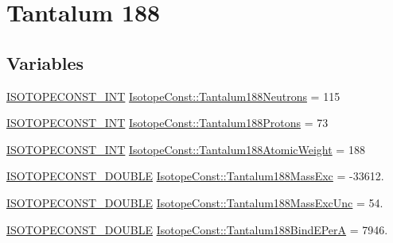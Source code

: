 \hypertarget{group___isotope_const-_tantalum-_ta188}{}\section{Tantalum 188}
\label{group___isotope_const-_tantalum-_ta188}
\subsection*{Variables}
\begin{DoxyCompactItemize}
\item 
\mbox{\hyperlink{group___isotope_const-_macros_ga5f18360b3e99483a35c32d789e62621c}{I\+S\+O\+T\+O\+P\+E\+C\+O\+N\+S\+T\+\_\+\+I\+NT}} \mbox{\hyperlink{group___isotope_const-_tantalum-_ta188_ga2b395f6f2262f135de4d45d89b075531}{Isotope\+Const\+::\+Tantalum188\+Neutrons}} = 115
\item 
\mbox{\hyperlink{group___isotope_const-_macros_ga5f18360b3e99483a35c32d789e62621c}{I\+S\+O\+T\+O\+P\+E\+C\+O\+N\+S\+T\+\_\+\+I\+NT}} \mbox{\hyperlink{group___isotope_const-_tantalum-_ta188_gab4442b2ecd0aeb4df27671aa385fe9a0}{Isotope\+Const\+::\+Tantalum188\+Protons}} = 73
\item 
\mbox{\hyperlink{group___isotope_const-_macros_ga5f18360b3e99483a35c32d789e62621c}{I\+S\+O\+T\+O\+P\+E\+C\+O\+N\+S\+T\+\_\+\+I\+NT}} \mbox{\hyperlink{group___isotope_const-_tantalum-_ta188_ga32574c9578e79318248dab5877d17a56}{Isotope\+Const\+::\+Tantalum188\+Atomic\+Weight}} = 188
\item 
\mbox{\hyperlink{group___isotope_const-_macros_ga8f45a7272ce02c0b4c65c44636ed719a}{I\+S\+O\+T\+O\+P\+E\+C\+O\+N\+S\+T\+\_\+\+D\+O\+U\+B\+LE}} \mbox{\hyperlink{group___isotope_const-_tantalum-_ta188_gacd8e315ae92b3cd43ef7856eb8709cc6}{Isotope\+Const\+::\+Tantalum188\+Mass\+Exc}} = -\/33612.
\item 
\mbox{\hyperlink{group___isotope_const-_macros_ga8f45a7272ce02c0b4c65c44636ed719a}{I\+S\+O\+T\+O\+P\+E\+C\+O\+N\+S\+T\+\_\+\+D\+O\+U\+B\+LE}} \mbox{\hyperlink{group___isotope_const-_tantalum-_ta188_gad22fa56917ed04244588abeb58a9c116}{Isotope\+Const\+::\+Tantalum188\+Mass\+Exc\+Unc}} = 54.
\item 
\mbox{\hyperlink{group___isotope_const-_macros_ga8f45a7272ce02c0b4c65c44636ed719a}{I\+S\+O\+T\+O\+P\+E\+C\+O\+N\+S\+T\+\_\+\+D\+O\+U\+B\+LE}} \mbox{\hyperlink{group___isotope_const-_tantalum-_ta188_gafb2341cd11302a91ffb49384f80c7cda}{Isotope\+Const\+::\+Tantalum188\+Bind\+E\+PerA}} = 7946.
\item 

\end{DoxyCompactItemize}
